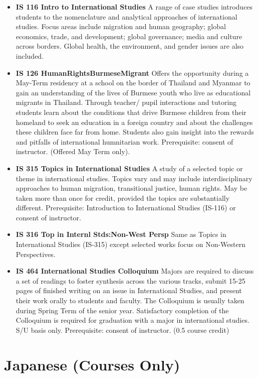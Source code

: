 \documentclass[
  letterpaper,
]{scrbook}
\providecommand{\tightlist}{%
  \setlength{\itemsep}{0pt}\setlength{\parskip}{0pt}}
\begin{document}
\begin{itemize}
\tightlist
\item
  \textbf{IS 116 Intro to International Studies} A range of case studies
  introduces students to the nomenclature and analytical approaches of
  international studies. Focus areas include migration and human
  geography; global economics, trade, and development; global
  governance; media and culture across borders. Global health, the
  environment, and gender issues are also included.
\item
  \textbf{IS 126 HumanRightsBurmeseMigrant} Offers the opportunity
  during a May-Term residency at a school on the border of Thailand and
  Myanmar to gain an understanding of the lives of Burmese youth who
  live as educational migrants in Thailand. Through teacher/ pupil
  interactions and tutoring students learn about the conditions that
  drive Burmese children from their homeland to seek an education in a
  foreign country and about the challenges these children face far from
  home. Students also gain insight into the rewards and pitfalls of
  international humnitarian work. Prerequisite: consent of instructor.
  (Offered May Term only).
\item
  \textbf{IS 315 Topics in International Studies} A study of a selected
  topic or theme in international studies. Topics vary and may include
  interdisciplinary approaches to human migration, transitional justice,
  human rights. May be taken more than once for credit, provided the
  topics are substantially different. Prerequisite: Introduction to
  International Studies (IS-116) or consent of instructor.
\item
  \textbf{IS 316 Top in Internl Stds:Non-West Persp} Same as Topics in
  International Studies (IS-315) except selected works focus on
  Non-Western Perspectives.
\item
  \textbf{IS 464 International Studies Colloquium} Majors are required
  to discuss a set of readings to foster synthesis across the various
  tracks, submit 15-25 pages of finished writing on an issue in
  International Studies, and present their work orally to students and
  faculty. The Colloquium is usually taken during Spring Term of the
  senior year. Satisfactory completion of the Colloquium is required for
  graduation with a major in international studies. S/U basis only.
  Prerequisite: consent of instructor. (0.5 course credit)
\end{itemize}

\section{Japanese (Courses Only)}\label{sec-japanese}
\end{document}
